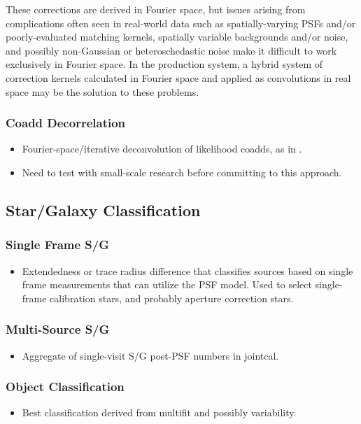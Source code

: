 These corrections are derived in Fourier space, but issues arising from complications often seen in real-world data such as spatially-varying PSFs and/or poorly-evaluated matching kernels, spatially variable backgrounds and/or noise, and possibly non-Gaussian or heteroschedastic noise make it difficult to work exclusively in Fourier space. In the production system, a hybrid system of correction kernels calculated in Fourier space and applied as convolutions in real space may be the solution to these problems. 

\subsubsection{Coadd Decorrelation}
\label{sec:acCoaddDecorrelation}
\begin{itemize}
\item Fourier-space/iterative deconvolution of likelihood coadds, as in .
\item Need to test with small-scale research before committing to this approach.
\end{itemize}

\subsection{Star/Galaxy Classification}
\label{sec:acClassification}
\subsubsection{Single Frame S/G}
\label{sec:acSingleFrameClassification}
\begin{itemize}
\item Extendedness or trace radius difference that classifies sources based on single frame measurements that can utilize the PSF model.  Used to select single-frame calibration stars, and probably aperture correction stars.
\end{itemize}
\subsubsection{Multi-Source S/G}
\label{sec:acJointCalClassification}
\begin{itemize}
\item Aggregate of single-visit S/G post-PSF numbers in jointcal.
\end{itemize}
\subsubsection{Object Classification}
\label{sec:acObjectClassification}
\begin{itemize}
\item Best classification derived from multifit and possibly variability.
\end{itemize}

